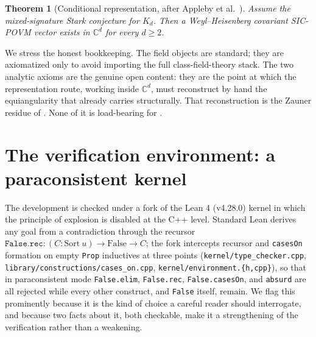 \documentclass[12pt,a4paper]{article}
\newtheorem{theorem}{Theorem}[section]
\begin{document}
\begin{theorem}[Conditional representation, after Appleby et al.\ \cite{Appleby2017}]
Assume the mixed-signature Stark conjecture for $K_d$. Then a Weyl--Heisenberg
covariant SIC-POVM vector exists in $\mathbb{C}^d$ for every $d \geq 2$.
\end{theorem}

We stress the honest bookkeeping. The field objects are standard; they are
axiomatized only to avoid importing the full class-field-theory stack. The two
analytic axioms are the genuine open content: they are the point at which the
representation route, working inside $\mathbb{C}^d$, must reconstruct by hand
the equiangularity that  already carries structurally.
That reconstruction is the Zauner residue of . None
of it is load-bearing for .

\section{The verification environment: a paraconsistent kernel}
\label{sec:kernel}

The development is checked under a fork of the Lean 4 (v4.28.0) kernel in which
the principle of explosion is disabled at the C++ level. Standard Lean derives
any goal from a contradiction through the recursor
$\texttt{False.rec} : (C : \mathrm{Sort}\ u) \to \mathrm{False} \to C$; the fork
intercepts recursor and \texttt{casesOn} formation on empty \texttt{Prop}
inductives at three points (\texttt{kernel/type\_checker.cpp},
\texttt{library/constructions/cases\_on.cpp},
\texttt{kernel/environment.\{h,cpp\}}), so that in paraconsistent mode
\texttt{False.elim}, \texttt{False.rec}, \texttt{False.casesOn}, and
\texttt{absurd} are all rejected while every other construct, and \texttt{False}
itself, remain. We flag this prominently because it is the kind of choice a
careful reader should interrogate, and because two facts about it, both
checkable, make it a strengthening of the verification rather than a weakening.
\end{document}
